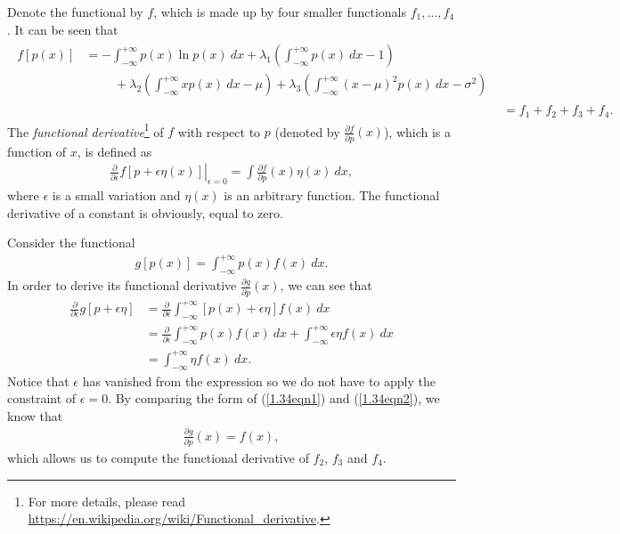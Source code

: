 \begin{answer}{}
	Denote the functional by $f$, which is made up by four smaller functionals $f_1, \ldots, f_4$. It can be seen that
	\begin{align}
		\begin{split}\label{1.34eqn0}
			f[p(x)] &= - \int_{-\infty}^{+\infty} p(x) \ln p(x)\ dx + \lambda_1 \left( \int_{-\infty}^{+\infty} p(x)\ dx - 1 \right)\\
			&\phantom{=}\quad + \lambda_2\left( \int_{-\infty}^{+\infty} xp(x)\ dx - \mu \right) + \lambda_3\left( \int_{-\infty}^{+\infty} (x-\mu)^2p(x)\ dx - \sigma^2 \right)
		\end{split}\\
		&= f_1 + f_2 + f_3 + f_4.
	\end{align}
	The \emph{functional derivative}\footnote{For more details, please read \url{https://en.wikipedia.org/wiki/Functional_derivative}.} of $f$ with respect to $p$ (denoted by $\frac{\partial f}{\partial p}(x)$), which is a function of $x$, is defined as
	\begin{align}\label{1.34eqn1}
		\left.\frac{\partial}{\partial \epsilon}f[p + \epsilon \eta(x)]\right\rvert_{\epsilon = 0} = \int \frac{\partial f}{\partial p}(x) \eta(x)\ dx,
	\end{align}
	where $\epsilon$ is a small variation and $\eta(x)$ is an arbitrary function. The functional derivative of a constant is obviously, equal to zero.
	
	Consider the functional
	\begin{align}
		g[p(x)] = \int_{-\infty}^{+\infty} p(x) f(x)\ dx.
	\end{align}
	In order to derive its functional derivative $\frac{\partial g}{\partial p}(x)$, we can see that
	\begin{align}
		\frac{\partial}{\partial \epsilon}g[p + \epsilon \eta] &= \frac{\partial}{\partial \epsilon} \int_{-\infty}^{+\infty} [p(x) + \epsilon\eta] f(x)\ dx\\
		&= \frac{\partial}{\partial \epsilon} \int_{-\infty}^{+\infty} p(x)f(x)\ dx + \int_{-\infty}^{+\infty} \epsilon\eta f(x)\ dx\\
		&= \int_{-\infty}^{+\infty} \eta f(x)\ dx.\label{1.34eqn2}
	\end{align}
	Notice that $\epsilon$ has vanished from the expression so we do not have to apply the constraint of $\epsilon = 0$. By comparing the form of (\ref{1.34eqn1}) and (\ref{1.34eqn2}), we know that
	\begin{align}
		\frac{\partial g}{\partial p}(x) = f(x),
	\end{align}
	which allows us to compute the functional derivative of $f_2$, $f_3$ and $f_4$.


\end{answer}
